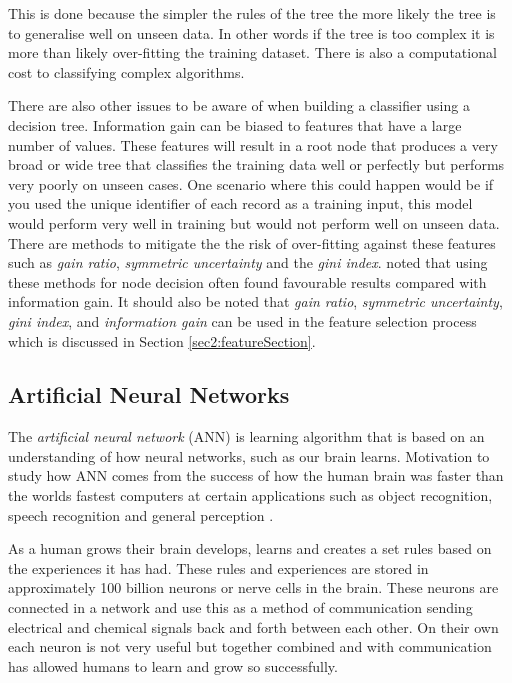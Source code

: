 This is done because the simpler the rules of the tree the more likely the tree is to generalise well on unseen data. In other words if the tree is too complex it is more than likely over-fitting the training dataset. There is also a computational cost to classifying complex algorithms. 

There are also other issues to be aware of when building a classifier using a decision tree. Information gain can be biased to features that have a large number of values. These features will result in a root node that produces a very broad or wide tree that classifies the training data well or perfectly but performs very poorly on unseen cases. One scenario where this could happen would be if you used the unique identifier of each record  as a training input, this model would perform very well in training but would not perform well on unseen data. There are methods to mitigate the the risk of over-fitting against these features such as \textit{gain ratio}, \textit{symmetric uncertainty} and the \textit{gini index}. \cite{quinlan_induction_1986} noted that using these methods for node decision often found favourable results compared with information gain. It should also be noted that \textit{gain ratio}, \textit{symmetric uncertainty}, \textit{gini index}, and \textit{information gain} can be used in the feature selection process which is discussed in Section \ref{sec2:featureSection}.

\subsection{Artificial Neural Networks} \label{neuralNets}
The \textit{artificial neural network} (ANN) is learning algorithm that is based on an understanding of how neural networks, such as our brain learns. Motivation to study how ANN comes from the success of how the human brain was faster than the worlds fastest computers at certain applications such as object recognition, speech recognition and general perception \citep{haykin_neural_1998}.

As a human grows their brain develops, learns and creates a set rules based on the experiences it has had. These rules and experiences are stored in approximately 100 billion neurons or nerve cells in the brain. These neurons are connected in a network and use this as a method of communication sending electrical and chemical signals back and forth between each other. On their own each neuron is not very useful but together combined and with communication has allowed humans to learn and grow so successfully. 

